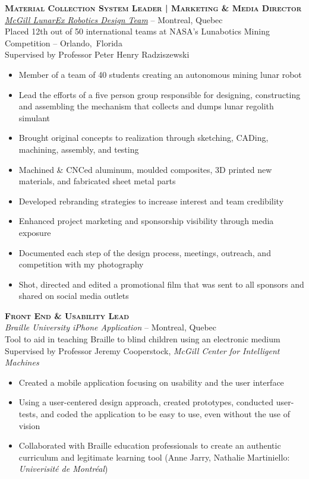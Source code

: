 \documentclass[12pt, letterpaper]{article}
\newcommand{\years}[1]{\marginnote{\footnotesize #1}} %
\begin{document}
\clearpage

\begin{samepage}
\years{8/2012 - 8/2013} \textbf{\scshape Material Collection System Leader | Marketing \& Media Director}\\
\href{http://www.lunarex.mcgill.ca}{\textit{McGill LunarEx Robotics Design Team}} -- Montreal, Quebec\\
{\small Placed 12th out of 50 international teams at NASA's Lunabotics Mining Competition -- Orlando,~Florida\\
Supervised by Professor Peter Henry Radziszewski}
\begin{itemize}
\item Member of a team of 40 students creating an autonomous mining lunar robot 
\item Lead the efforts of a five person group responsible for designing, constructing and assembling the mechanism that collects and dumps lunar regolith simulant
\item Brought original concepts to realization through sketching, CADing, machining, assembly, and testing
\item Machined \& CNCed aluminum, moulded composites, 3D printed new materials, and fabricated sheet metal parts
\item Developed rebranding strategies to increase interest and team credibility
\item Enhanced project marketing and sponsorship visibility through media exposure
\item Documented each step of the design process,  meetings, outreach, and competition with my photography
\item Shot, directed and edited a promotional film that was sent to all sponsors and shared on social media outlets
\end{itemize}
\end {samepage}

\begin{samepage}
\years{1/2013 - 8/2013} \textbf{\scshape Front End \& Usability Lead}\\
\textit{Braille University iPhone Application} -- Montreal, Quebec\\
Tool to aid in teaching Braille to blind children using an electronic medium\\
{\small Supervised by Professor Jeremy Cooperstock, \textsl {McGill Center for Intelligent Machines}}
\begin{itemize}
\item Created a mobile application focusing on usability and the user interface
\item Using a user-centered design approach, created prototypes, conducted user-tests, and coded the application to be easy to use, even without the use of vision
\item Collaborated with Braille education professionals to create an authentic curriculum and legitimate learning tool (Anne Jarry, Nathalie Martiniello: \textit {Univerisit\'e de Montr\'eal})
\end{itemize}
\end {samepage}
\end{document}
